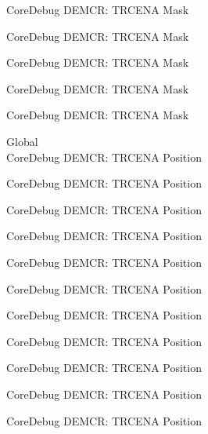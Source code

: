 \begin{DoxyRefList}
\label{deprecated__deprecated000868}%
%
Core\+Debug DEMCR\+: TRCENA Mask 

\label{deprecated__deprecated001010}%
%
Core\+Debug DEMCR\+: TRCENA Mask 

\label{deprecated__deprecated001086}%
%
Core\+Debug DEMCR\+: TRCENA Mask 

\label{deprecated__deprecated001175}%
%
Core\+Debug DEMCR\+: TRCENA Mask 

\label{deprecated__deprecated001277}%
%
Core\+Debug DEMCR\+: TRCENA Mask  
\item[Global \doxylink{group___c_m_s_i_s___core_debug_ga6ff2102b98f86540224819a1b767ba39}{Core\+Debug\+\_\+\+DEMCR\+\_\+\+TRCENA\+\_\+\+Pos} ]\hfill \\
\label{deprecated__deprecated000045}%
%
Core\+Debug DEMCR\+: TRCENA Position 

\label{deprecated__deprecated000189}%
%
Core\+Debug DEMCR\+: TRCENA Position 

\label{deprecated__deprecated000331}%
%
Core\+Debug DEMCR\+: TRCENA Position 

\label{deprecated__deprecated000407}%
%
Core\+Debug DEMCR\+: TRCENA Position 

\label{deprecated__deprecated000496}%
%
Core\+Debug DEMCR\+: TRCENA Position 

\label{deprecated__deprecated000598}%
%
Core\+Debug DEMCR\+: TRCENA Position 

\label{deprecated__deprecated000723}%
%
Core\+Debug DEMCR\+: TRCENA Position 

\label{deprecated__deprecated000867}%
%
Core\+Debug DEMCR\+: TRCENA Position 

\label{deprecated__deprecated001009}%
%
Core\+Debug DEMCR\+: TRCENA Position 

\label{deprecated__deprecated001085}%
%
Core\+Debug DEMCR\+: TRCENA Position 

\label{deprecated__deprecated001174}%
%
Core\+Debug DEMCR\+: TRCENA Position 


\end{DoxyRefList}
